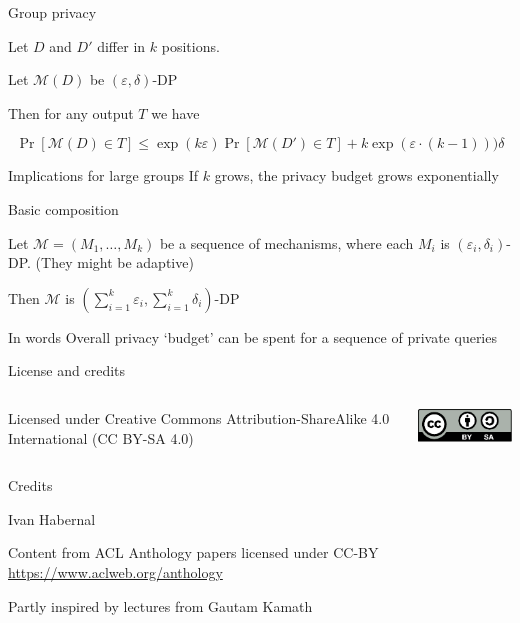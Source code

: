 \documentclass[12pt,aspectratio=169,handout]{beamer}
\begin{document}
\begin{frame}{Group privacy}

Let $D$ and $D'$ differ in $k$ positions.

Let $\mathcal{M}(D)$ be $(\varepsilon, \delta)$-DP

Then for any output $T$ we have

$$
\Pr[\mathcal{M}(D) \in T] \leq \exp(k \varepsilon) \Pr[\mathcal{M}(D') \in T] +
k \exp(\varepsilon \cdot (k - 1)))
\delta
$$

\begin{block}{Implications for large groups}
If $k$ grows, the privacy budget grows exponentially
\end{block}

\end{frame}


\begin{frame}{Basic composition}

Let $\mathcal{M} = (M_1, \ldots, M_k)$ be a sequence of mechanisms, where each $M_i$ is $(\varepsilon_i, \delta_i)$-DP. (They might be adaptive)

Then $\mathcal{M}$ is $(\sum_{i = 1}^{k} \varepsilon_i, \sum_{i = 1}^{k} \delta_i )$-DP

\begin{block}{In words}
Overall privacy `budget' can be spent for a sequence of private queries
\end{block}

\end{frame}


\begin{frame}{License and credits}

	\begin{columns}
		\begin{column}{0.7\textwidth}
			Licensed under Creative Commons Attribution-ShareAlike 4.0 International (CC BY-SA 4.0)
		\end{column}
		\begin{column}{0.2\textwidth}
			\includegraphics[width=0.9\linewidth]{img/cc-by-sa-icon.pdf}
		\end{column}
	\end{columns}
	
	\bigskip
	
	Credits
	
	\begin{scriptsize}
		
		Ivan Habernal
		
		Content from ACL Anthology papers licensed under CC-BY \url{https://www.aclweb.org/anthology}
		
		Partly inspired by lectures from Gautam Kamath
	
	\end{scriptsize}
	
\end{frame}
\end{document}
